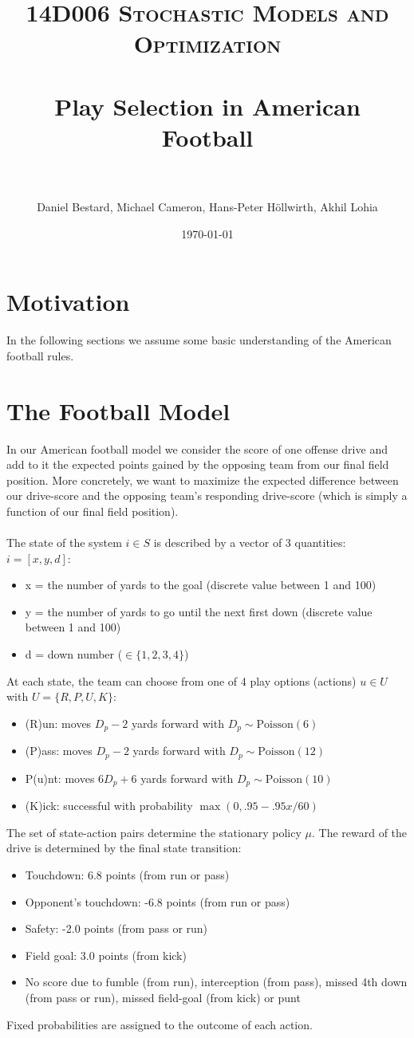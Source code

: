 \documentclass[11pt, oneside]{article}   	%
\title{
\normalfont \normalsize
\textsc{14D006 Stochastic Models and Optimization} \\ [25pt] %
\horrule{0.5pt} \\[0.4cm] %
\huge Play Selection in American Football\\ %
\horrule{2pt} \\[0.5cm] %
}
\author{Daniel Bestard, Michael Cameron, Hans-Peter H{\"o}llwirth, Akhil Lohia} %
\date{\normalsize\today} %
\begin{document}
\maketitle

\section{Motivation}
In the following sections we assume some basic understanding of the American football rules.


\section{The Football Model}
In our American football model we consider the score of one offense drive and add to it the expected points gained by the opposing team from our final field position. More concretely, we want to maximize the expected difference between our drive-score and the opposing team's responding drive-score (which is simply a function of our final field position). \\\\
The state of the system $i \in S$ is described by a vector of 3 quantities: $i = [x,y,d]$:
\begin{itemize}
\item x = the number of yards to the goal (discrete value between 1 and 100)
\item y = the number of yards to go until the next first down (discrete value between 1 and 100)
\item d = down number ($\in \{1,2,3,4\}$)
\end{itemize}
At each state, the team can choose from one of 4 play options (actions) $u \in U$ with $U=\{R, P, U, K\}$:
\begin{itemize}
\item (R)un: moves $D_p - 2$ yards forward with $D_p \sim \text{Poisson}(6)$ 
\item (P)ass: moves $D_p - 2$ yards forward with $D_p \sim \text{Poisson}(12)$ 
\item P(u)nt: moves $6 D_p  + 6$ yards forward with $D_p \sim \text{Poisson}(10)$ 
\item (K)ick: successful with probability $\max(0, .95 - .95x/60)$
\end{itemize}
The set of state-action pairs determine the stationary policy $\mu$. The reward of the drive is determined by the final state transition:
\begin{itemize}
\item Touchdown: 6.8 points (from run or pass) 
\item Opponent's touchdown: -6.8 points (from run or pass)
\item Safety: -2.0 points (from pass or run)
\item Field goal: 3.0 points (from kick)
\item No score due to fumble (from run), interception (from pass), missed 4th down (from pass or run), missed field-goal (from kick) or punt
\end{itemize}
Fixed probabilities are assigned to the outcome of each action.
\end{document}
